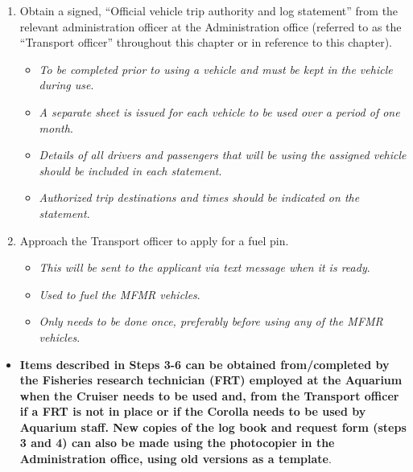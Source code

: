 \documentclass[
  letterpaper,
  DIV=11,
  numbers=noendperiod]{scrreprt}
\providecommand{\tightlist}{%
  \setlength{\itemsep}{0pt}\setlength{\parskip}{0pt}}\usepackage{longtable,booktabs,array}
\begin{document}
\begin{enumerate}
\def\labelenumi{\arabic{enumi}.}
\tightlist
\item
  Obtain a signed, ``Official vehicle trip authority and log statement''
  from the relevant administration officer at the Administration office
  (referred to as the ``Transport officer'' throughout this chapter or
  in reference to this chapter).

  \begin{itemize}
  \tightlist
  \item
    \emph{To be completed prior to using a vehicle and must be kept in
    the vehicle during use}.
  \item
    \emph{A separate sheet is issued for each vehicle to be used over a
    period of one month}.
  \item
    \emph{Details of all drivers and passengers that will be using the
    assigned vehicle should be included in each statement}.
  \item
    \emph{Authorized trip destinations and times should be indicated on
    the statement}.
  \end{itemize}
\item
  Approach the Transport officer to apply for a fuel pin.

  \begin{itemize}
  \tightlist
  \item
    \emph{This will be sent to the applicant via text message when it is
    ready}.
  \item
    \emph{Used to fuel the MFMR vehicles}.
  \item
    \emph{Only needs to be done once, preferably before using any of the
    MFMR vehicles}.
  \end{itemize}
\end{enumerate}

\begin{itemize}
\tightlist
\item
  \textbf{Items described in Steps 3-6 can be obtained from/completed by
  the Fisheries research technician (FRT) employed at the Aquarium when
  the Cruiser needs to be used and, from the Transport officer if a FRT
  is not in place or if the Corolla needs to be used by Aquarium staff.
  New copies of the log book and request form (steps 3 and 4) can also
  be made using the photocopier in the Administration office, using old
  versions as a template}.
\end{itemize}
\end{document}
